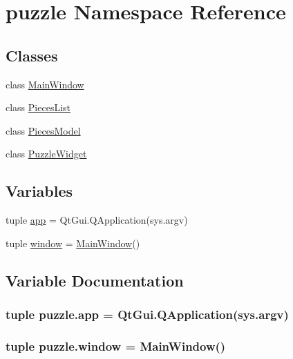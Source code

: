 \hypertarget{namespacepuzzle}{}\section{puzzle Namespace Reference}
\label{namespacepuzzle}
\subsection*{Classes}
\begin{DoxyCompactItemize}
\item 
class \hyperlink{classpuzzle_1_1MainWindow}{Main\+Window}
\item 
class \hyperlink{classpuzzle_1_1PiecesList}{Pieces\+List}
\item 
class \hyperlink{classpuzzle_1_1PiecesModel}{Pieces\+Model}
\item 
class \hyperlink{classpuzzle_1_1PuzzleWidget}{Puzzle\+Widget}
\end{DoxyCompactItemize}
\subsection*{Variables}
\begin{DoxyCompactItemize}
\item 
tuple \hyperlink{namespacepuzzle_a84a947ab5f908c5e38f606c890716268}{app} = Qt\+Gui.\+Q\+Application(sys.\+argv)
\item 
tuple \hyperlink{namespacepuzzle_aed85b8ae1ddec884a6f9e61216353e74}{window} = \hyperlink{classpuzzle_1_1MainWindow}{Main\+Window}()
\end{DoxyCompactItemize}


\subsection{Variable Documentation}
\hypertarget{namespacepuzzle_a84a947ab5f908c5e38f606c890716268}{}
\subsubsection[{app}]{\setlength{\rightskip}{0pt plus 5cm}tuple puzzle.\+app = Qt\+Gui.\+Q\+Application(sys.\+argv)}\label{namespacepuzzle_a84a947ab5f908c5e38f606c890716268}
\hypertarget{namespacepuzzle_aed85b8ae1ddec884a6f9e61216353e74}{}
\subsubsection[{window}]{\setlength{\rightskip}{0pt plus 5cm}tuple puzzle.\+window = {\bf Main\+Window}()}\label{namespacepuzzle_aed85b8ae1ddec884a6f9e61216353e74}

